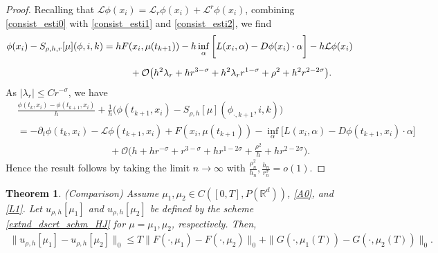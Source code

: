 \documentclass[a4paper,  twoside, 10pt, leqno]{amsart}
\newcommand{\rd}{\mathbb{R}^d}
\newtheorem{thm}{Theorem}[section]
\theoremstyle{remark}
\theoremstyle{definition}
\begin{document}
\begin{proof}
\noindent Recalling that $\mathcal{L} \phi ( x_{i} ) = \mathcal{L}_{r} \phi ( x_{i} ) + \mathcal{L}^{r} \phi ( x_{i} ) $,
combining \eqref{consist_esti0} with \eqref{consist_esti1} and \eqref{consist_esti2}, we find 
\begin{align*}
\phi ( x_{i} ) - S_{\rho,h,r} [ \mu ] ( \phi, i,k ) & = h F ( x_{i}, \mu ( t_{k+1} ) ) - h \inf_{\alpha} \bigg[   L ( x_{i}, \alpha ) -  D \phi ( x_{i} ) \cdot \alpha \bigg]  - h  \mathcal{L} \phi ( x_{i} )  \\[0.2cm] 
        &\hspace*{1cm} + \mathcal{O} \big( h^2\lambda_r + hr^{3-\sigma} + h^2 \lambda_r r^{1-\sigma} + \rho^2 + h^2 r^{2-2\sigma}\big).
\end{align*}
 As $|\lambda_r| \leq C r^{-\sigma}$, we have 
\begin{align*}
& \frac{\phi(t_{k},x_i)- \phi(t_{k+1},x_i)}{h} +  \frac{1}{h} \Big(\phi(t_{k+1},x_i)  - S_{ \rho, h} [ \mu ] ( \phi_{\cdot,k+1}, i, k )\Big) \\
& =  - \partial_t \phi(t_{k},x_i) -   \mathcal{L} \phi (t_{k+1}, x_{i} ) +  F ( x_{i}, \mu ( t_{k+1} ) )   -  \inf_{\alpha} \bigg[   L (x_{i}, \alpha)  -  D \phi ( t_{k+1},x_{i} ) \cdot \alpha \bigg]    \\
& \hspace{4cm} + \mathcal{O} \big(h+ h r^{-\sigma} + r^{3-\sigma} + h r^{1-2\sigma} + \frac{\rho^2}{h} + h r^{2-2\sigma} \big).
\end{align*}  
Hence the result follows by taking the limit $n \to \infty$ with $\frac{\rho_{n}^2}{h_{n}} ,\frac{h_{n}}{r_{n}^{\sigma}} = o ( 1 )$.
\end{proof}






\begin{thm} \label{hjb_discrete_comparison}
    (Comparison) Assume $\mu_1,\mu_2\in C([0,T],P(\rd))$, \ref{A0}, and \ref{L1}.
    Let $u_{\rho,h}[\mu_1]$ and ${u}_{\rho,h}[\mu_2] $ be defined by the scheme 
    \eqref{extnd_dscrt_schm_HJ} for $\mu=\mu_1,\mu_2$, respectively. Then,
    \begin{align*}
        \| u_{\rho,h}[\mu_1] - u_{\rho,h}[\mu_2]  \|_{0} \leq T \| F(\cdot,\mu_1) - F(\cdot,\mu_2)   \|_{0} + \| G(\cdot,\mu_1(T)) - G(\cdot,\mu_2(T))  \|_{0} .  
    \end{align*}
\end{thm}
\end{document}
